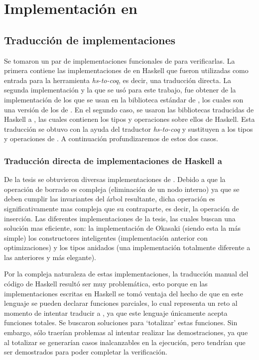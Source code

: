\chapter{Implementación en {\coq}}

\section{Traducción de implementaciones}
Se tomaron un par de implementaciones funcionales de {\arns} para verificarlas. La primera contiene 
las implementaciones de \cite{tesisG} en Haskell que fueron utilizadas como entrada para la 
herramienta \textit{hs-to-coq}, es decir, una traducci\'on directa. La segunda implementaci\'on y la 
que se us\'o para este trabajo, fue obtener de \cite{MSetRBT} la implementaci\'on de los {\arns} que 
se usan en la biblioteca estándar de {\coq}, los cuales son una versi\'on de los {\arns} de 
\cite{Okasaki}. En el segundo caso, se usaron las bibliotecas traducidas de Haskell a {\coq}, 
las cuales contienen los tipos y operaciones sobre ellos de Haskell. Esta traducción se obtuvo con 
la ayuda del traductor \textit{hs-to-coq} y sustituyen a los tipos y operaciones de {\coq}. A 
continuación profundizaremos de estos  dos casos.

\subsection{Traducción directa de implementaciones de Haskell a {\coq}}
De la tesis \cite{tesisG} se obtuvieron diversas implementaciones de {\arns}. Debido a que la 
operaci\'on de borrado es compleja (eliminaci\'on de un nodo interno) ya que se deben cumplir las 
invariantes del \'arbol resultante, dicha operación es significativamente mas compleja que su 
contraparte, es decir, la operación de inserci\'on. Las diferentes implementaciones de la 
tesis\cite{tesisG}, las cuales buscan una soluci\'on mas eficiente, son: la implementación de 
Okasaki (siendo esta la m\'as simple) los constructores inteligentes (implementaci\'on anterior con 
optimizaciones) y los tipos anidados (una implementaci\'on totalmente diferente a las anteriores y 
m\'as elegante).

Por la compleja naturaleza de estas implementaciones, la traducción manual del código de Haskell 
result\'o ser muy problemática, esto porque en las implementaciones escritas en Haskell se tom\'o 
ventaja del hecho de que en este lenguaje se pueden declarar funciones parciales, lo cual representa
un reto al momento de intentar traducir a {\coq}, ya que este lenguaje únicamente 
acepta funciones totales. Se buscaron soluciones para `totalizar' estas funciones. Sin embargo,
s\'olo traerían problemas al intentar realizar las demostraciones, ya que al totalizar se generar\'ian 
casos inalcanzables en la ejecuci\'on, pero tendrían que ser demostrados para poder completar la 
verificaci\'on.

